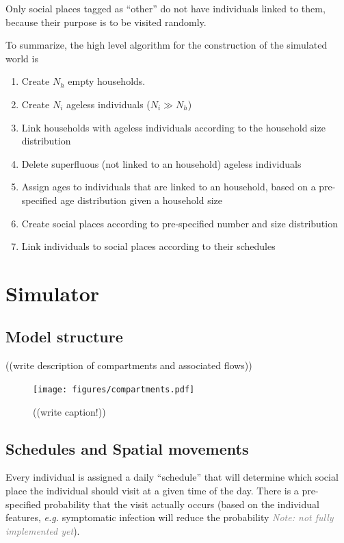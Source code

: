 \documentclass[11pt, onecolumn]{article}
\newcommand{\note}[1]{\textit{\textcolor{Grey}{Note: #1}}}
\newcommand{\eg}{\textit{e.g.}\xspace}
\begin{document}
Only social places tagged as ``other'' do not have individuals linked to them, because their purpose is to be visited randomly. 

To summarize, the high level algorithm for the construction of the simulated world is
\begin{enumerate}
\item Create $N_h$ empty households. 
\item Create $N_i$ ageless individuals ($N_i \gg N_h$)
\item Link households with ageless individuals according to the household size distribution
\item Delete superfluous (not linked to an household) ageless individuals 
\item Assign ages to individuals that are linked to an household, based on a pre-specified age distribution given a household size
\item Create social places according to pre-specified number and size distribution
\item Link individuals to social places according to their schedules
\end{enumerate}



\section{Simulator}

\subsection{Model structure}

((write description of compartments and associated flows))

\begin{figure}[!ht]
\centering
    \texttt{[image: figures/compartments.pdf]}
\caption{((write caption!))}
\label{fig:compartments}
\end{figure}


\subsection{Schedules and Spatial movements}

Every individual is assigned a daily ``schedule'' that will determine which social place the individual should visit at a given time of the day. There is a pre-specified probability that the visit actually occurs (based on the individual features, \eg symptomatic infection will reduce the probability \note{not fully implemented yet}).
\end{document}
